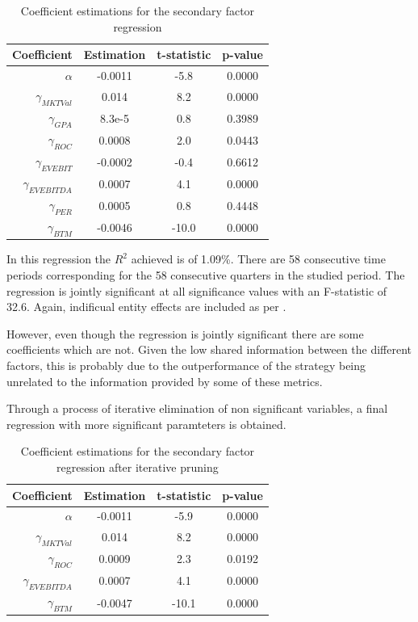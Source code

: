 \begin{table}[ht]
    \centering
    \begin{tabular}{rccc}
        \toprule
        Coefficient & Estimation & t-statistic & p-value \\ 
        \midrule
        $\alpha$ & -0.0011 & -5.8 & 0.0000 \\
        $\gamma_{MKTVal}$ & 0.014 & 8.2 & 0.0000 \\
        $\gamma_{GPA}$ & 8.3e-5 & 0.8 & 0.3989 \\
        $\gamma_{ROC}$ & 0.0008 & 2.0 & 0.0443 \\
        $\gamma_{EVEBIT}$ & -0.0002 & -0.4 & 0.6612 \\
        $\gamma_{EVEBITDA}$ & 0.0007 & 4.1 & 0.0000 \\
        $\gamma_{PER}$ & 0.0005 & 0.8 & 0.4448 \\
        $\gamma_{BTM}$ & -0.0046 & -10.0 & 0.0000 \\
        \bottomrule
    \end{tabular}
    \caption{Coefficient estimations for the secondary factor regression}
    \label{table:secondary-regression-results-1}
\end{table}

In this regression the $R^2$ achieved is of 1.09\%. There are 58 consecutive time periods corresponding for the 58 consecutive quarters in the studied period. The regression is jointly significant at all significance values with an F-statistic of 32.6. Again, indificual entity effects are included as per \cite{ian_wagner_2019}. 

However, even though the regression is jointly significant there are some coefficients which are not. Given the low shared information between the different factors, this is probably due to the outperformance of the strategy being unrelated to the information provided by some of these metrics. 

Through a process of iterative elimination of non significant variables, a final regression with more significant paramteters is obtained. 

\begin{table}[ht]
    \centering
    \begin{tabular}{rccc}
        \toprule
        Coefficient & Estimation & t-statistic & p-value \\ 
        \midrule
        $\alpha$ & -0.0011 & -5.9 & 0.0000 \\
        $\gamma_{MKTVal}$ & 0.014 & 8.2 & 0.0000 \\
        $\gamma_{ROC}$ & 0.0009 & 2.3 & 0.0192 \\
        $\gamma_{EVEBITDA}$ & 0.0007 & 4.1 & 0.0000 \\
        $\gamma_{BTM}$ & -0.0047 & -10.1 & 0.0000 \\
        \bottomrule
    \end{tabular}
    \caption{Coefficient estimations for the secondary factor regression after iterative pruning}
    \label{table:secondary-regression-results-2}
\end{table}

